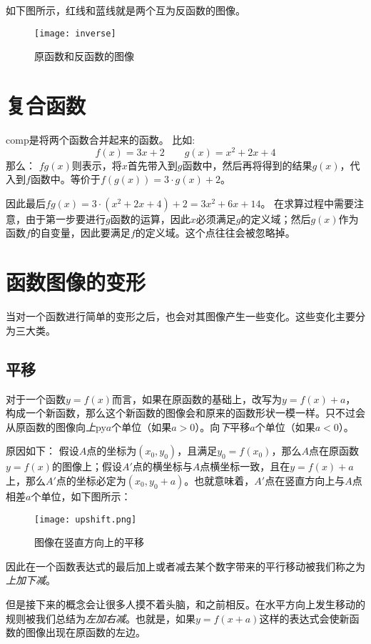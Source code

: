 如下图所示，红线和蓝线就是两个互为反函数的图像。
\begin{figure}[H]
\centering
\texttt{[image: inverse]} %
\caption{原函数和反函数的图像}
\end{figure}
\clearpage

\section{复合函数}
\label{sec:Composite Function}
\gls{comp}是将两个函数合并起来的函数。
比如:
\[f(x)=3x+2 \qquad g(x)=x^2+2x+4\]
那么： $fg(x)$则表示，将$x$首先带入到$g$函数中，然后再将得到的结果$g(x)$，代入到$f$函数中。等价于$f(g(x))=3\cdot g(x)+2$。

因此最后$fg(x)=3\cdot(x^2+2x+4)+2=3x^2+6x+14$。
在求算过程中需要注意，由于第一步要进行$g$函数的运算，因此$x$必须满足$g$的定义域；然后$g(x)$作为函数$f$的自变量，因此要满足$f$的定义域。这个点往往会被忽略掉。
\clearpage


\section{函数图像的变形}
\label{sec:Transformation of graphs}
当对一个函数进行简单的变形之后，也会对其图像产生一些变化。这些变化主要分为三大类。

\subsection*{平移}
\label{subsec:Translation}
对于一个函数$y=f(x)$而言，如果在原函数的基础上，改写为$y=f(x)+a$，构成一个新函数，那么这个新函数的图像会和原来的函数形状一模一样。只不过会从原函数的图像向\emph{上}\gls{py}$a$个单位（如果$a>0$）。向\emph{下}平移$a$个单位（如果$a<0$）。

原因如下：
假设$A$点的坐标为$(x_0,y_0)$，且满足$y_0=f(x_0)$，那么$A$点在原函数$y=f(x)$的图像上；假设$A'$点的横坐标与$A$点横坐标一致，且在$y=f(x)+a$上，那么$A'$点的坐标必定为$(x_0,y_0+a)$。也就意味着，$A'$点在竖直方向上与$A$点相差$a$个单位，如下图所示：
\begin{figure}[H]
\centering
\texttt{[image: upshift.png]}
\caption{图像在竖直方向上的平移}
\end{figure}

因此在一个函数表达式的最后加上或者减去某个数字带来的平行移动被我们称之为\emph{上加下减}。

但是接下来的概念会让很多人摸不着头脑，和之前相反。在水平方向上发生移动的规则被我们总结为\emph{左加右减}。也就是，如果$y=f(x+a)$这样的表达式会使新函数的图像出现在原函数的左边。


